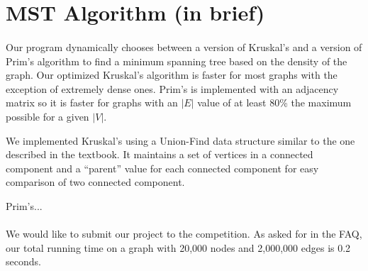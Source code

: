 \section{MST Algorithm (in brief)}
\label{sec:algbrief}

\paragraph{}
Our program dynamically chooses between a version of Kruskal's and a
version of Prim's
algorithm to find a minimum spanning tree based on the density of the
graph. Our optimized Kruskal's
algorithm is faster for most graphs with the exception of extremely dense
ones. Prim's is implemented with an adjacency matrix so it is faster for
graphs with an $|E|$ value of at least 80\% the maximum possible for a
given $|V|$.

We implemented Kruskal's using a Union-Find data structure similar to the
one described in the textbook. It maintains a set of vertices in a
connected component and a ``parent'' value for each connected component
for easy comparison of two connected component.

Prim's...

\paragraph{}
We would like to submit our project to the competition. As asked for in
the FAQ, our total running time on a graph with 20,000 nodes and 2,000,000
edges is 0.2 seconds.
